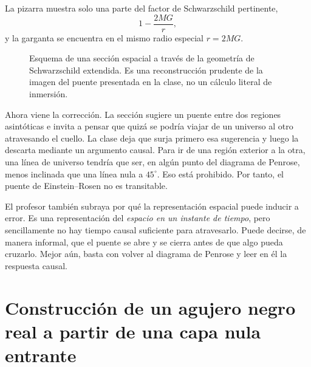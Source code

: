 La pizarra muestra solo una parte del factor de Schwarzschild pertinente,
\begin{equation}
1-\frac{2MG}{r},
\end{equation}
y la garganta se encuentra en el mismo radio especial \(r=2MG\).

\begin{figure}[htbp]
\centering
{}
\caption{Esquema de una sección espacial a través de la geometría de Schwarzschild extendida. Es una reconstrucción prudente de la imagen del puente presentada en la clase, no un cálculo literal de inmersión.}
\end{figure}

Ahora viene la corrección. La sección sugiere un puente entre dos regiones asintóticas e invita a pensar que quizá se podría viajar de un universo al otro atravesando el cuello. La clase deja que surja primero esa sugerencia y luego la descarta mediante un argumento causal. Para ir de una región exterior a la otra, una línea de universo tendría que ser, en algún punto del diagrama de Penrose, menos inclinada que una línea nula a \(45^\circ\). Eso está prohibido. Por tanto, el puente de Einstein--Rosen no es transitable.

El profesor también subraya por qué la representación espacial puede inducir a error. Es una representación del \emph{espacio en un instante de tiempo}, pero sencillamente no hay tiempo causal suficiente para atravesarlo. Puede decirse, de manera informal, que el puente se abre y se cierra antes de que algo pueda cruzarlo. Mejor aún, basta con volver al diagrama de Penrose y leer en él la respuesta causal.

\section{Construcción de un agujero negro real a partir de una capa nula entrante}

